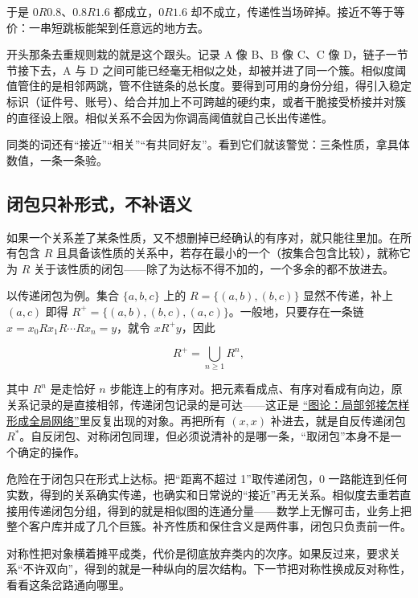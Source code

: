 于是 \(0R0.8\)、\(0.8R1.6\) 都成立，\(0R1.6\) 却不成立，传递性当场碎掉。接近不等于等价：一串短跳板能架到任意远的地方去。

开头那条去重规则栽的就是这个跟头。记录 A 像 B、B 像 C、C 像 D，链子一节节接下去，A 与 D 之间可能已经毫无相似之处，却被并进了同一个簇。相似度阈值管住的是相邻两跳，管不住链条的总长度。要得到可用的身份分组，得引入稳定标识（证件号、账号）、给合并加上不可跨越的硬约束，或者干脆接受桥接并对簇的直径设上限。相似关系不会因为你调高阈值就自己长出传递性。

同类的词还有``接近''``相关''``有共同好友''。看到它们就该警觉：三条性质，拿具体数值，一条一条验。

\subsection{闭包只补形式，不补语义}

如果一个关系差了某条性质，又不想删掉已经确认的有序对，就只能往里加。在所有包含 \(R\) 且具备该性质的关系中，若存在最小的一个（按集合包含比较），就称它为 \(R\) 关于该性质的闭包——除了为达标不得不加的，一个多余的都不放进去。

以传递闭包为例。集合 \(\{a,b,c\}\) 上的 \(R=\{(a,b),(b,c)\}\) 显然不传递，补上 \((a,c)\) 即得 \(R^{+}=\{(a,b),(b,c),(a,c)\}\)。一般地，只要存在一条链 \(x=x_{0}Rx_{1}R\cdots Rx_{n}=y\)，就令 \(xR^{+}y\)，因此

\[
R^{+}=\bigcup_{n\ge 1}R^{n},
\]

其中 \(R^{n}\) 是走恰好 \(n\) 步能连上的有序对。把元素看成点、有序对看成有向边，原关系记录的是直接相邻，传递闭包记录的是可达——这正是 \hyperref[ch:028]{``图论：局部邻接怎样形成全局网络''}里反复出现的对象。再把所有 \((x,x)\) 补进去，就是自反传递闭包 \(R^{*}\)。自反闭包、对称闭包同理，但必须说清补的是哪一条，``取闭包''本身不是一个确定的操作。

危险在于闭包只在形式上达标。把``距离不超过 1''取传递闭包，\(0\) 一路能连到任何实数，得到的关系确实传递，也确实和日常说的``接近''再无关系。相似度去重若直接用传递闭包分组，得到的就是相似图的连通分量——数学上无懈可击，业务上把整个客户库并成了几个巨簇。补齐性质和保住含义是两件事，闭包只负责前一件。

对称性把对象横着摊平成类，代价是彻底放弃类内的次序。如果反过来，要求关系``不许双向''，得到的就是一种纵向的层次结构。下一节把对称性换成反对称性，看看这条岔路通向哪里。
